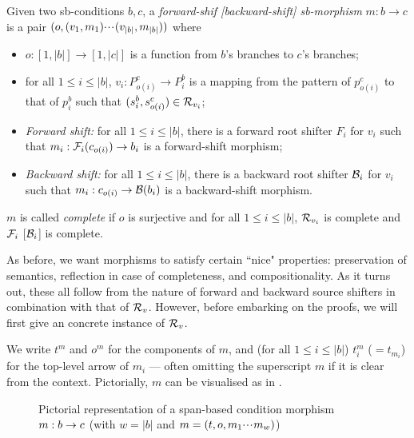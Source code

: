 \begin{definition}
  Given two sb-conditions $b,c$, a \emph{forward-shif [backward-shift] sb-morphism} $m:b\to c$ is a pair $(o,(v_1,m_1){\cdotp\mkern-2mu\cdotp\mkern-2mu\cdotp\mkern1mu} (v_{|b|},m_{|b|}))$ where
  \begin{itemize}
  \item $o:[1,|b|]\to [1,|c|]$ is a function from $b$'s branches to $c$'s branches;
  \item for all $1\leq i\leq |b|$, $v_i:P^c_{o(i)}\to P^b_i$ is a mapping from the pattern of $p^c_{o(i)}$ to that of $p^b_i$ such that $(s^b_i,s^c_{o(i)})\in \mathcal{R}_{v_i}$;
  \item \emph{Forward shift:} for all $1\leq i\leq |b|$, there is a forward root shifter $F_i$ for $v_i$ such that $m_i:\mathcal{F}_i(c_{o(i)})\to b_i$ is a forward-shift morphism;
  \item \emph{Backward shift:} for all $1\leq i\leq |b|$, there is a backward root shifter $\mathcal{B}_i$ for $v_i$ such that $m_i:c_{o(i)}\to \mathcal{B}(b_i)$ is a backward-shift morphism.
  \end{itemize}
  $m$ is called \emph{complete} if $o$ is surjective and for all $1\leq i\leq |b|$, $\mathcal{R}_{v_i}$ is complete and $\mathcal{F}_i$ [$\mathcal{B}_i$] is complete.
\end{definition}
%
As before, we want morphisms to satisfy certain ``nice" properties: preservation of semantics, reflection in case of completeness, and compositionality. As it turns out, these all follow from the nature of forward and backward source shifters in combination with that of $\mathcal{R}_v$. However, before embarking on the proofs, we will first give an concrete instance of $\mathcal{R}_v$.


%
\begin{center}

\end{center}
%
We write $t^m$ and $o^m$ for the components of $m$, and (for all $1\leq i\leq |b|$) $t^m_i$ ($=t_{m_i}$) for the top-level arrow of $m_i$ --- often omitting the superscript $m$ if it is clear from the context. Pictorially, $m$ can be visualised as in .
%
\begin{figure}
  \centering
  
  \caption{Pictorial representation of a span-based condition morphism $m:b\rightarrow c$ (with $w=|b|$ and $m=(t,o,m_1{\cdotp\mkern-2mu\cdotp\mkern-2mu\cdotp\mkern1mu} m_w)$)}
\end{figure}
%

